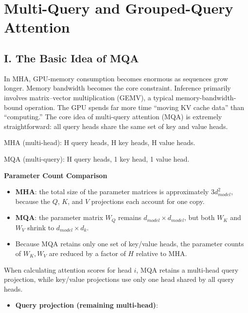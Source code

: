 \setcounter{section}{3}

\hypertarget{multi-query-and-grouped-query-attention}{%
\section{Multi-Query and Grouped-Query Attention}\label{multi-query-and-grouped-query-attention}}

\hypertarget{i.-the-basic-idea-of-mqa}{%
\subsection{I. The Basic Idea of MQA}\label{i.-the-basic-idea-of-mqa}}

In MHA, GPU-memory consumption becomes enormous as sequences grow longer. Memory bandwidth becomes the core constraint. Inference primarily involves matrix--vector multiplication (GEMV), a typical memory-bandwidth-bound operation. The GPU spends far more time ``moving KV cache data'' than ``computing.'' The core idea of multi-query attention (MQA) is extremely straightforward: all query heads share the same set of key and value heads.

MHA (multi-head): H query heads, H key heads, H value heads.

MQA (multi-query): H query heads, 1 key head, 1 value head.

\textbf{Parameter Count Comparison}

\begin{itemize}
\tightlist
\item
  \textbf{MHA}: the total size of the parameter matrices is approximately \(3d_{model}^2\), because the \(Q\), \(K\), and \(V\) projections each account for one copy.
\item
  \textbf{MQA}: the parameter matrix \(W_Q\) remains \(d_{model} \times d_{model}\), but both \(W_K\) and \(W_V\) shrink to \(d_{model} \times d_k\).
\item
  Because MQA retains only one set of key/value heads, the parameter counts of \(W_K,W_V\) are reduced by a factor of \(H\) relative to MHA.
\end{itemize}

When calculating attention scores for head \(i\), MQA retains a multi-head query projection, while key/value projections use only one head shared by all query heads.

\begin{itemize}
\tightlist
\item
{}
  \textbf{Query projection (remaining multi-head)}:
\end{itemize}


